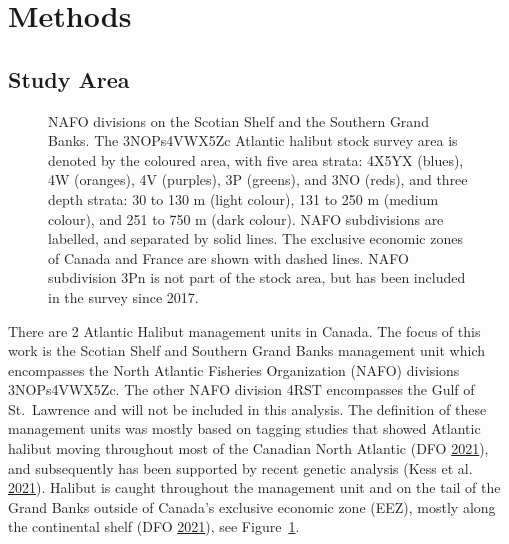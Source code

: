 \documentclass[12pt]{article}\usepackage[]{graphicx}\usepackage[]{color}
\begin{document}
\hypertarget{methods}{%
\section{Methods}\label{methods}}

\hypertarget{study-area}{%
\subsection{Study Area}\label{study-area}}
\begin{figure}[htb]

{\centering {} 

}

\caption{NAFO divisions on the Scotian Shelf and the Southern Grand Banks. The 3NOPs4VWX5Zc Atlantic halibut stock survey area is denoted by the coloured area, with five area strata: 4X5YX (blues), 4W (oranges), 4V (purples), 3P (greens), and 3NO (reds), and three depth strata: 30 to 130 m (light colour), 131 to 250 m (medium colour), and 251 to 750 m (dark colour). NAFO subdivisions are labelled, and separated by solid lines. The exclusive economic zones of Canada and France are shown with dashed lines. NAFO subdivision 3Pn is not part of the stock area, but has been included in the survey since 2017.}\label{fig:nafo-strat}
\end{figure}
There are 2 Atlantic Halibut management units in Canada. The focus of this work is the Scotian Shelf and Southern Grand Banks management unit which encompasses the North Atlantic Fisheries Organization (NAFO) divisions 3NOPs4VWX5Zc. The other NAFO division 4RST encompasses the Gulf of St.~Lawrence and will not be included in this analysis. The definition of these management units was mostly based on tagging studies that showed Atlantic halibut moving throughout most of the Canadian North Atlantic (DFO \protect\hyperlink{ref-DFO2021}{2021}), and subsequently has been supported by recent genetic analysis (Kess et al. \protect\hyperlink{ref-Kess2021}{2021}). Halibut is caught throughout the management unit and on the tail of the Grand Banks outside of Canada's exclusive economic zone (EEZ), mostly along the continental shelf (DFO \protect\hyperlink{ref-DFO2021}{2021}), see Figure~\ref{fig:nafo-strat}.
\end{document}

